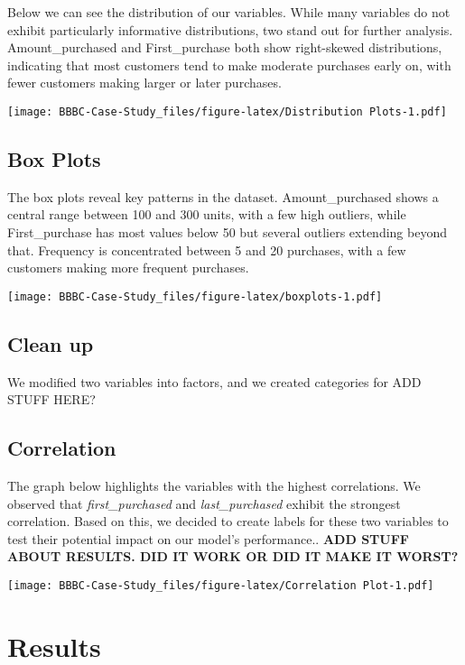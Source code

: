 \documentclass[
]{article}
\begin{document}
Below we can see the distribution of our variables. While many variables
do not exhibit particularly informative distributions, two stand out for
further analysis. Amount\_purchased and First\_purchase both show
right-skewed distributions, indicating that most customers tend to make
moderate purchases early on, with fewer customers making larger or later
purchases.

\texttt{[image: BBBC-Case-Study\_files/figure-latex/Distribution Plots-1.pdf]}

\hypertarget{box-plots}{%
\subsection{Box Plots}\label{box-plots}}

The box plots reveal key patterns in the dataset. Amount\_purchased
shows a central range between 100 and 300 units, with a few high
outliers, while First\_purchase has most values below 50 but several
outliers extending beyond that. Frequency is concentrated between 5 and
20 purchases, with a few customers making more frequent purchases.

\texttt{[image: BBBC-Case-Study\_files/figure-latex/boxplots-1.pdf]}

\hypertarget{clean-up}{%
\subsection{Clean up}\label{clean-up}}

We modified two variables into factors, and we created categories for
ADD STUFF HERE?

\hypertarget{correlation}{%
\subsection{Correlation}\label{correlation}}

The graph below highlights the variables with the highest correlations.
We observed that \emph{first\_purchased} and \emph{last\_purchased}
exhibit the strongest correlation. Based on this, we decided to create
labels for these two variables to test their potential impact on our
model's performance.. \textbf{ADD STUFF ABOUT RESULTS. DID IT WORK OR
DID IT MAKE IT WORST?}

\texttt{[image: BBBC-Case-Study\_files/figure-latex/Correlation Plot-1.pdf]}

\hypertarget{results}{%
\section{Results}\label{results}}
\end{document}
